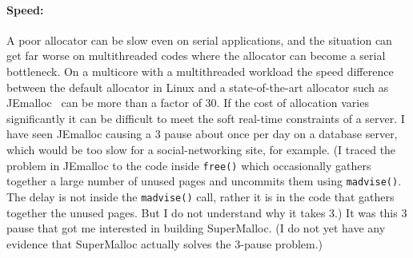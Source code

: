 \documentclass[natbib,sort&compress,10pt]{sigplanconf}
\newcommand{\code}[1]{\texttt{#1}}
\begin{document}
{\paragraph{Speed:}} A poor allocator can be slow even on serial
applications, and the situation can get far worse on multithreaded
codes where the allocator can become a serial bottleneck.  On a
multicore with a multithreaded workload the speed difference between
the default allocator in Linux \cite{Lea96} and a state-of-the-art
allocator such as JEmalloc~\cite{Evans06} can be more than a factor of
30.  If the cost of allocation varies significantly it can be
difficult to meet the soft real-time constraints of a server.  I have
seen JEmalloc causing a \unit{3}\second{} pause about once per day on
a database server, which would be too slow for a social-networking
site, for example. (I traced the problem in JEmalloc to the code
inside \code{free()} which occasionally gathers together a large
number of unused pages and uncommits them using \code{madvise()}.  The
delay is not inside the \code{madvise()} call, rather it is in the
code that gathers together the unused pages.  But I do not understand
why it takes \unit{3}\second{}.)  It was this \unit{3}\second{} pause
that got me interested in building SuperMalloc.  (I do not yet have
any evidence that SuperMalloc actually solves the
\unit{3}\second{}-pause problem.)
\end{document}
